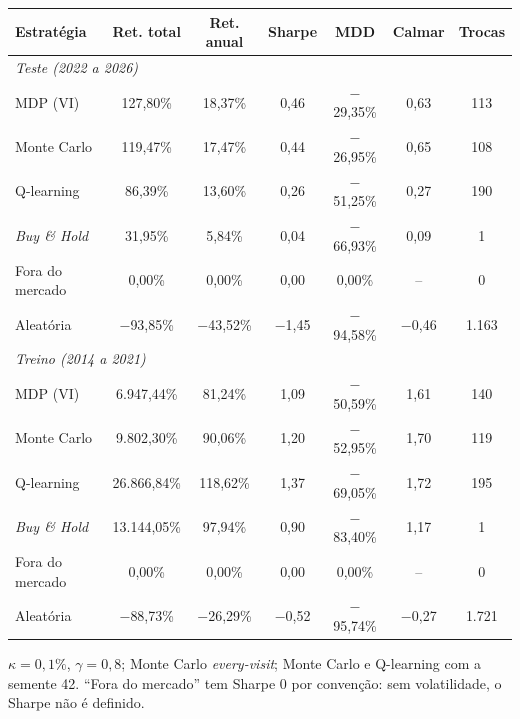 \documentclass[11pt,a4paper]{article}
\begin{document}
\begin{center}
\small
\setlength{\tabcolsep}{5pt}
\begin{tabular}{l cccccc}
  \toprule
  \textbf{Estratégia} & \textbf{Ret. total} & \textbf{Ret. anual} & \textbf{Sharpe} & \textbf{MDD} & \textbf{Calmar} & \textbf{Trocas} \\
  \midrule
  \multicolumn{7}{l}{\textit{Teste (2022 a 2026)}} \\
  MDP (VI)                       & 127,80\%    & 18,37\%    & 0,46    & $-$29,35\% & 0,63    & 113 \\
  Monte Carlo                    & 119,47\%    & 17,47\%    & 0,44    & $-$26,95\% & 0,65    & 108 \\
  Q-learning                     & 86,39\%     & 13,60\%    & 0,26    & $-$51,25\% & 0,27    & 190 \\
  \textit{Buy \& Hold}           & 31,95\%     & 5,84\%     & 0,04    & $-$66,93\% & 0,09    & 1 \\
  Fora do mercado                & 0,00\%      & 0,00\%     & 0,00    & 0,00\%     & --      & 0 \\
  Aleatória                      & $-$93,85\%  & $-$43,52\% & $-$1,45 & $-$94,58\% & $-$0,46 & 1.163 \\
  \midrule
  \multicolumn{7}{l}{\textit{Treino (2014 a 2021)}} \\
  MDP (VI)                       & 6.947,44\%  & 81,24\%    & 1,09    & $-$50,59\% & 1,61    & 140 \\
  Monte Carlo                    & 9.802,30\%  & 90,06\%    & 1,20    & $-$52,95\% & 1,70    & 119 \\
  Q-learning                     & 26.866,84\% & 118,62\%   & 1,37    & $-$69,05\% & 1,72    & 195 \\
  \textit{Buy \& Hold}           & 13.144,05\% & 97,94\%    & 0,90    & $-$83,40\% & 1,17    & 1 \\
  Fora do mercado                & 0,00\%      & 0,00\%     & 0,00    & 0,00\%     & --      & 0 \\
  Aleatória                      & $-$88,73\%  & $-$26,29\% & $-$0,52 & $-$95,74\% & $-$0,27 & 1.721 \\
  \bottomrule
\end{tabular}

\smallskip
{\footnotesize $\kappa = 0{,}1\%$, $\gamma = 0{,}8$; Monte Carlo \textit{every-visit}; Monte Carlo e Q-learning com a semente 42. ``Fora do mercado'' tem Sharpe 0 por convenção: sem volatilidade, o Sharpe não é definido.}
\end{center}
\end{document}
